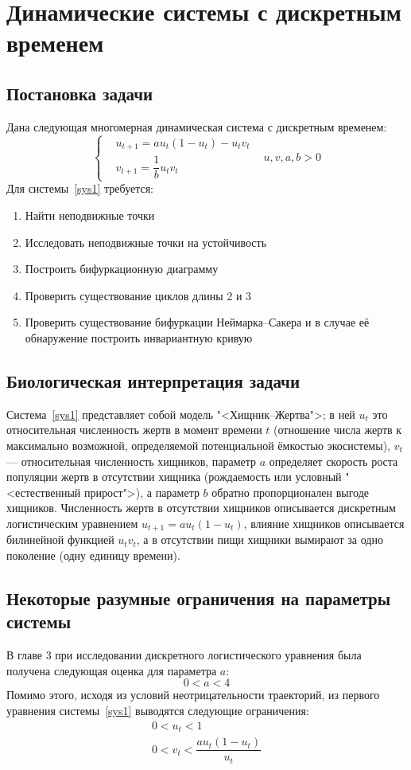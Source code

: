 \section{Динамические системы с дискретным временем}
\subsection{Постановка задачи}
Дана следующая многомерная динамическая система с дискретным временем:
\begin{equation}
    \label{sys1}
    \left\{
    \begin{aligned}
        &u_{t+1} = au_t(1 - u_t) - u_tv_t&\\
        &v_{t+1} = \dfrac{1}{b}u_tv_t&
    \end{aligned}
    \right.u, v, a, b > 0
\end{equation}
Для системы~\eqref{sys1} требуется:
\begin{enumerate}
    \item Найти неподвижные точки 
    \item Исследовать неподвижные точки на устойчивость
    \item Построить бифуркационную диаграмму
    \item Проверить существование циклов длины 2 и 3
    \item Проверить существование бифуркации Неймарка--Сакера и в случае её обнаружение построить инвариантную кривую
\end{enumerate}
\subsection{Биологическая интерпретация задачи}
Система~\eqref{sys1} представляет собой модель "<Хищник--Жертва">; в ней \(u_t\) это относительная численность жертв в момент времени \(t\) (отношение числа жертв к максимально возможной, определяемой потенциальной ёмкостью экосистемы), \(v_t\) --- относительная численность хищников, параметр \(a\) определяет скорость роста популяции жертв в отсутствии хищника (рождаемость или условный "<естественный прирост">), а параметр \(b\) обратно пропорционален выгоде хищников. Численность жертв в отсутствии хищников описывается дискретным логистическим уравнением \(u_{t+1} = au_t(1 - u_t)\), влияние хищников описывается билинейной функцией \(u_tv_t\), а в отсутствии пищи хищники вымирают за одно поколение (одну единицу времени).
\subsection{Некоторые разумные ограничения на параметры системы}
В главе 3 \cite{Bratus} при исследовании дискретного логистического уравнения была получена следующая оценка для параметра \(a\):
\begin{equation}
    \label{a_bound}
    0 < a < 4
\end{equation}
Помимо этого, исходя из условий неотрицательности траекторий, из первого уравнения системы~\eqref{sys1} выводятся следующие ограничения:
\begin{gather}
    \label{u_bound}
    0 < u_t < 1\\
    \label{v_bound}
    0 < v_t < \dfrac{au_t(1 - u_t)}{u_t}
\end{gather}
